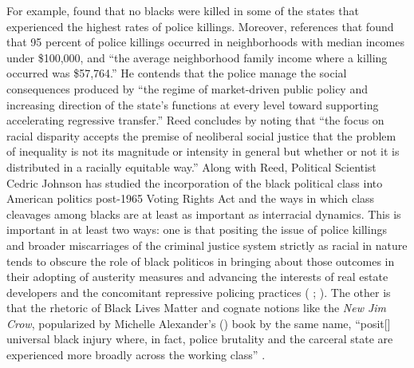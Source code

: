 \documentclass[12pt]{article}
\begin{document}
For example, \textcite{reedHowRacialDisparity2016} found that no blacks were killed in some of the states that experienced the highest rates of police killings. Moreover, \textcite{reedHowRacialDisparity2016} references that \textcite{jilani95PoliceKillings2015} found that 95 percent of police killings occurred in neighborhoods with median incomes under \$100,000, and “the average neighborhood family income where a killing occurred was \$57,764.” He contends that the police manage the social consequences produced by “the regime of market-driven public policy and increasing direction of the state’s functions at every level toward supporting accelerating regressive transfer.” Reed concludes by noting that “the focus on racial disparity accepts the premise of neoliberal social justice that the problem of inequality is not its magnitude or intensity in general but whether or not it is distributed in a racially equitable way.” Along with Reed, Political Scientist Cedric Johnson has studied the incorporation of the black political class into American politics post-1965 Voting Rights Act and the ways in which class cleavages among blacks are at least as important as interracial dynamics. This is important in at least two ways: one is that positing the issue of police killings and broader miscarriages of the criminal justice system strictly as racial in nature tends to obscure the role of black politicos in bringing about those outcomes in their adopting of austerity measures and advancing the interests of real estate developers and the concomitant repressive policing practices (\citeauthor{johnsonAfterwordBaltimorePolicing2016} \citeyear[305]{johnsonAfterwordBaltimorePolicing2016}; \citeyear[179]{johnsonTrumpismPolicingProblem2019}). The other is that the rhetoric of Black Lives Matter and cognate notions like the \textit{New Jim Crow}, popularized by Michelle Alexander’s (\citeyear{alexanderNewJimCrow2010}) book by the same name, “posit[] universal black injury where, in fact, police brutality and the carceral state are experienced more broadly across the working class” \parencite*[317]{johnsonAfterwordBaltimorePolicing2016}.

\end{document}

